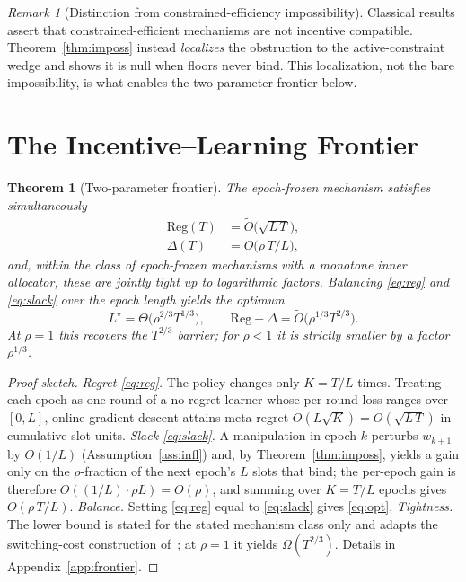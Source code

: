\documentclass[conference]{IEEEtran}
\newtheorem{theorem}{Theorem}
\theoremstyle{definition}
\theoremstyle{remark}
\newtheorem{remark}{Remark}
\newcommand{\Slots}{T}
\newcommand{\Ep}{L}
\newcommand{\Neps}{K}
\newcommand{\rhobind}{\rho}
\newcommand{\wt}{w}
\newcommand{\Reg}{\mathrm{Reg}}
\newcommand{\Slack}{\Delta}
\newcommand{\Otil}{\tilde{O}}
\begin{document}
\begin{remark}[Distinction from constrained-efficiency impossibility]
Classical results assert that constrained-efficient mechanisms are not incentive compatible. Theorem~\ref{thm:imposs} instead \emph{localizes} the obstruction to the active-constraint wedge and shows it is null when floors never bind. This localization, not the bare impossibility, is what enables the two-parameter frontier below.
\end{remark}

\section{The Incentive--Learning Frontier}\label{sec:frontier}

\begin{theorem}[Two-parameter frontier]\label{thm:frontier}
The epoch-frozen mechanism satisfies simultaneously
\begin{align}
\Reg(\Slots)&=\Otil\!\big(\sqrt{\Ep\,\Slots}\big),\label{eq:reg}\\
\Slack(\Slots)&=O\!\big(\rhobind\,\Slots/\Ep\big),\label{eq:slack}
\end{align}
and, within the class of epoch-frozen mechanisms with a monotone inner allocator, these are jointly tight up to logarithmic factors. Balancing \eqref{eq:reg} and \eqref{eq:slack} over the epoch length yields the optimum
\begin{equation}\label{eq:opt}
\Ep^\star=\Theta\!\big(\rhobind^{2/3}\Slots^{1/3}\big),\qquad
\Reg+\Slack=\Otil\!\big(\rhobind^{1/3}\Slots^{2/3}\big).
\end{equation}
At $\rhobind=1$ this recovers the $\Slots^{2/3}$ barrier; for $\rhobind<1$ it is strictly smaller by a factor $\rhobind^{1/3}$.
\end{theorem}

\begin{proof}[Proof sketch]
\emph{Regret \eqref{eq:reg}.} The policy changes only $\Neps=\Slots/\Ep$ times. Treating each epoch as one round of a no-regret learner whose per-round loss ranges over $[0,\Ep]$, online gradient descent attains meta-regret $\Otil(\Ep\sqrt{\Neps})=\Otil(\sqrt{\Ep\,\Slots})$ in cumulative slot units.
\emph{Slack \eqref{eq:slack}.} A manipulation in epoch $k$ perturbs $\wt_{k+1}$ by $O(1/\Ep)$ (Assumption~\ref{ass:infl}) and, by Theorem~\ref{thm:imposs}, yields a gain only on the $\rhobind$-fraction of the next epoch's $\Ep$ slots that bind; the per-epoch gain is therefore $O((1/\Ep)\cdot\rhobind\Ep)=O(\rhobind)$, and summing over $\Neps=\Slots/\Ep$ epochs gives $O(\rhobind\,\Slots/\Ep)$.
\emph{Balance.} Setting \eqref{eq:reg} equal to \eqref{eq:slack} gives \eqref{eq:opt}.
\emph{Tightness.} The lower bound is stated for the stated mechanism class only and adapts the switching-cost construction of~\cite{ref:dekel}; at $\rhobind=1$ it yields $\Omega(\Slots^{2/3})$. Details in Appendix~\ref{app:frontier}.
\end{proof}
\end{document}
